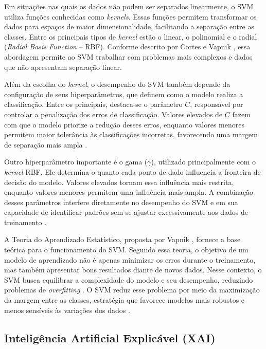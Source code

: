 \documentclass[
    12pt,                %
    openright,           %
    oneside,             %
    a4paper,             %
    english,             %
    brazil               %
]{abntex2}
\begin{document}
Em situações nas quais os dados não podem ser separados linearmente, o SVM utiliza funções conhecidas como \textit{kernels}. Essas funções permitem transformar os dados para espaços de maior dimensionalidade, facilitando a separação entre as classes. Entre os principais tipos de \textit{kernel} estão o linear, o polinomial e o radial (\textit{Radial Basis Function} -- RBF). Conforme descrito por Cortes e Vapnik \cite{cortespvapnik1995}, essa abordagem permite ao SVM trabalhar com problemas mais complexos e dados que não apresentam separação linear.

Além da escolha do \textit{kernel}, o desempenho do SVM também depende da configuração de seus hiperparâmetros, que definem como o modelo realiza a classificação. Entre os principais, destaca-se o parâmetro $C$, responsável por controlar a penalização dos erros de classificação. Valores elevados de $C$ fazem com que o modelo priorize a redução desses erros, enquanto valores menores permitem maior tolerância às classificações incorretas, favorecendo uma margem de separação mais ampla \cite{cortespvapnik1995}.

Outro hiperparâmetro importante é o gama ($\gamma$), utilizado principalmente com o \textit{kernel} RBF. Ele determina o quanto cada ponto de dado influencia a fronteira de decisão do modelo. Valores elevados tornam essa influência mais restrita, enquanto valores menores permitem uma influência mais ampla. A combinação desses parâmetros interfere diretamente no desempenho do SVM e em sua capacidade de identificar padrões sem se ajustar excessivamente aos dados de treinamento \cite{vapnik1998}.

A Teoria do Aprendizado Estatístico, proposta por Vapnik \cite{vapnik1998}, fornece a base teórica para o funcionamento do SVM. Segundo essa teoria, o objetivo de um modelo de aprendizado não é apenas minimizar os erros durante o treinamento, mas também apresentar bons resultados diante de novos dados. Nesse contexto, o SVM busca equilibrar a complexidade do modelo e seu desempenho, reduzindo problemas de \textit{overfitting} \cite{vapnik1998}. O SVM reduz esse problema por meio da maximização da margem entre as classes, estratégia que favorece modelos mais robustos e menos sensíveis às variações dos dados \cite{vapnik1998}.

\subsection{Inteligência Artificial Explicável (XAI)}
\end{document}
